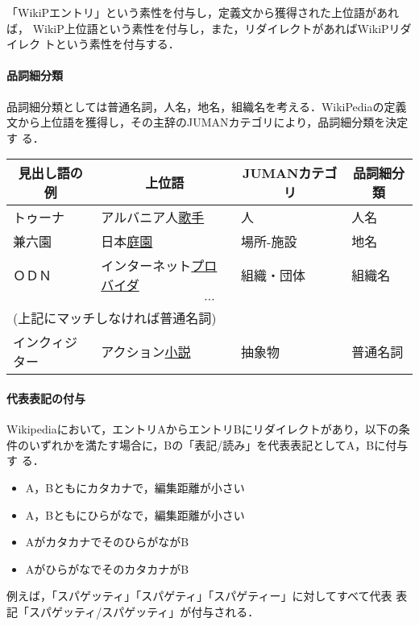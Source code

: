 \documentclass[a4j,titlepage]{jarticle}
\begin{document}
「WikiPエントリ」という素性を付与し，定義文から獲得された上位語があれば，
WikiP上位語という素性を付与し，また，リダイレクトがあればWikiPリダイレク
トという素性を付与する．

\paragraph{品詞細分類}

品詞細分類としては普通名詞，人名，地名，組織名を考える．WikiPediaの定義
文から上位語を獲得し，その主辞のJUMANカテゴリにより，品詞細分類を決定す
る．

\begin{center}
\begin{tabular}{llll}\hline
\multicolumn{1}{c}{見出し語の例} & \multicolumn{1}{c}{上位語} & \multicolumn{1}{c}{JUMANカテゴリ} & \multicolumn{1}{c}{品詞細分類} \\\hline
トゥーナ & アルバニア人\underline{歌手} & 人 & 人名 \\
兼六園 & 日本\underline{庭園} & 場所-施設 & 地名\\ 
ＯＤＮ & インターネット\underline{プロバイダ} & 組織・団体 & 組織名  \\
\multicolumn{4}{c}{$\cdots$}\\
\multicolumn{4}{l}{(上記にマッチしなければ普通名詞)}\\
インクィジター & アクション\underline{小説} & 抽象物 & 普通名詞  \\
\hline
 \end{tabular}
\end{center}

\paragraph{代表表記の付与}

Wikipediaにおいて，エントリAからエントリBにリダイレクトがあり，以下の条
件のいずれかを満たす場合に，Bの「表記/読み」を代表表記としてA，Bに付与す
る．

\begin{itemize}
\item A，Bともにカタカナで，編集距離が小さい
\item A，Bともにひらがなで，編集距離が小さい
\item AがカタカナでそのひらがながB
\item AがひらがなでそのカタカナがB
\end{itemize}

例えば，「スパゲッティ」「スパゲティ」「スパゲティー」に対してすべて代表
表記「スパゲッティ/スパゲッティ」が付与される．
\end{document}
